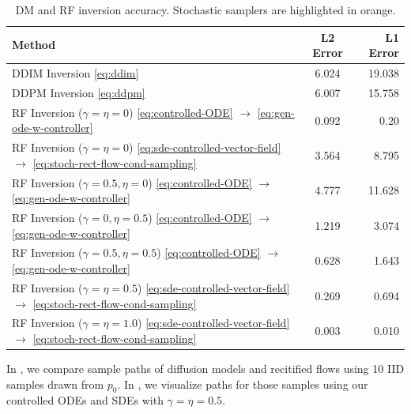\documentclass{article} %
\theoremstyle{plain}
\begin{document}
\begin{table}[!tbh]
\caption{DM and RF inversion accuracy. Stochastic samplers are highlighted in {\color{orange}orange}.}  
\label{tab:comp-faith-gauss}
\centering
\begin{tabular}{lcr}
\toprule
Method & L2 Error & L1 Error \\
\midrule
DDIM Inversion \eqref{eq:ddim} & 6.024 & 19.038 \\ 
\rowcolor{orange!25}
DDPM Inversion \eqref{eq:ddpm} & 6.007 & 15.758 \\ 
RF Inversion ($\gamma=\eta=0$) \eqref{eq:controlled-ODE} $\rightarrow$ \eqref{eq:gen-ode-w-controller} & 0.092 & 0.20 \\ 
\rowcolor{orange!25}
RF Inversion ($\gamma=\eta=0$) \eqref{eq:sde-controlled-vector-field} $\rightarrow$ \eqref{eq:stoch-rect-flow-cond-sampling} & 3.564 & 8.795 \\ 
RF Inversion ($\gamma=0.5, \eta=0$) \eqref{eq:controlled-ODE} $\rightarrow$ \eqref{eq:gen-ode-w-controller} & 4.777 & 11.628 \\ 
RF Inversion ($\gamma=0, \eta=0.5$) \eqref{eq:controlled-ODE} $\rightarrow$ \eqref{eq:gen-ode-w-controller} & 1.219 & 3.074 \\ 
RF Inversion ($\gamma=0.5, \eta=0.5$) \eqref{eq:controlled-ODE} $\rightarrow$ \eqref{eq:gen-ode-w-controller} & 0.628 & 1.643 \\ 
\rowcolor{orange!25}
RF Inversion ($\gamma=\eta=0.5$) \eqref{eq:sde-controlled-vector-field} $\rightarrow$ \eqref{eq:stoch-rect-flow-cond-sampling} & 0.269 & 0.694 \\ 
\rowcolor{orange!25}
RF Inversion ($\gamma=\eta=1.0$) \eqref{eq:sde-controlled-vector-field} $\rightarrow$ \eqref{eq:stoch-rect-flow-cond-sampling} & 0.003 & 0.010 \\ 
\bottomrule
\end{tabular}
\end{table}


In , we compare sample paths of diffusion models and recitified flows using 10 IID samples drawn from $p_0$.
In , we visualize paths for those samples using our controlled ODEs and SDEs with $\gamma= \eta=0.5$.
\end{document}
